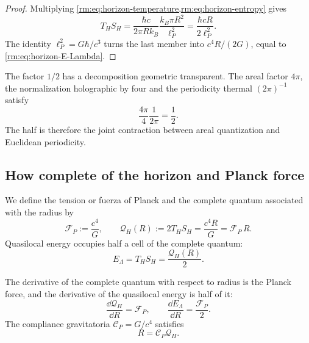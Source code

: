 \begin{proof}
Multiplying \cref{rm:eq:horizon-temperature,rm:eq:horizon-entropy} gives
\[
 T_HS_H
 =\frac{\hbar c}{2\pi Rk_B}
  \frac{k_B\pi R^2}{\ell_P^2}
 =\frac{\hbar cR}{2\ell_P^2}.
\]
The identity \(\ell_P^2=G\hbar/c^3\) turns the last member into
\(c^4R/(2G)\), equal to \cref{rm:eq:horizon-E-Lambda}.
\end{proof}

The factor \(1/2\) has a decomposition geometric transparent. The
areal factor \(4\pi\), the normalization holographic by four and the
periodicity thermal \((2\pi)^{-1}\) satisfy
\begin{equation}
 \frac{4\pi}{4}\frac1{2\pi}=\frac12.
 \label{rm:eq:horizon-half-factor}
\end{equation}
The half is therefore the joint contraction between areal quantization
and Euclidean periodicity.

\subsection{How complete of the horizon and Planck force}

We define the tension or fuerza of Planck and the complete quantum associated with the
radius by
\begin{equation}
 \mathscr F_P:=\frac{c^4}{G},
 \qquad
 \boxed{
 \mathcal Q_H(R):=2T_HS_H
 =\frac{c^4R}{G}=\mathscr F_P\,R.}
 \label{rm:eq:horizon-full-quantum}
\end{equation}
Quasilocal energy occupies half a cell of the complete quantum:
\begin{equation}
 \boxed{E_\Lambda=T_HS_H=\frac{\mathcal Q_H(R)}2.}
 \label{rm:eq:horizon-half-quantum-general}
\end{equation}

\begin{proposition}
\label{rm:prop:horizon-compliance}
The derivative of the complete quantum with respect to radius is the Planck force,
and the derivative of the quasilocal energy is half of it:
\begin{equation}
 \frac{\dd\mathcal Q_H}{\dd R}=\mathscr F_P,
 \qquad
 \frac{\dd E_\Lambda}{\dd R}=\frac{\mathscr F_P}{2}.
 \label{rm:eq:horizon-radial-derivatives}
\end{equation}
The compliance gravitatoria \(\mathscr C_P=G/c^4\) satisfies
\begin{equation}
 R=\mathscr C_P\mathcal Q_H.
 \label{rm:eq:horizon-compliance-law}
\end{equation}
\end{proposition}

